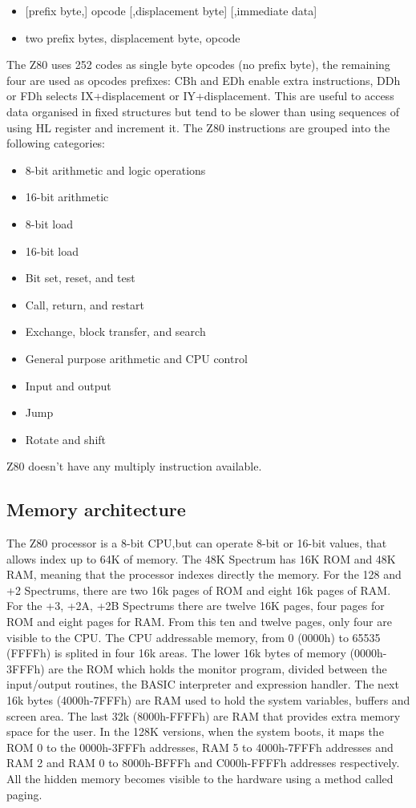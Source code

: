 \begin{itemize}
\item {[prefix byte,]  opcode  [,displacement byte]  [,immediate data]}
\item {two prefix bytes,  displacement byte,  opcode}
\end{itemize}
The Z80 uses 252 codes as single byte opcodes (no prefix byte), the remaining four are used as opcodes prefixes: CBh and EDh enable extra instructions, DDh or FDh selects IX+displacement or IY+displacement. This are useful to access data organised in fixed structures but tend to be slower than using sequences of using HL register and increment it.
The Z80 instructions are grouped into the following categories:
\begin{itemize}
\item {8-bit arithmetic and logic operations}
\item {16-bit arithmetic}
\item {8-bit load}
\item {16-bit load}
\item {Bit set, reset, and test}
\item {Call, return, and restart}
\item {Exchange, block transfer, and search}
\item {General purpose arithmetic and CPU control}
\item {Input and output}
\item {Jump}
\item {Rotate and shift}
\end{itemize}
Z80 doesn’t have any multiply instruction available.

\subsection{Memory architecture}
The Z80 processor is a 8-bit CPU,but can operate 8-bit or 16-bit values, that allows index up to 64K of memory. The 48K Spectrum has 16K ROM and 48K RAM, meaning that the processor indexes directly  the memory. For the 128 and +2 Spectrums, there are two 16k pages of ROM and eight 16k pages of RAM. For the +3, +2A, +2B Spectrums there are twelve 16K pages, four pages for ROM and eight pages for RAM. From this ten and twelve pages, only four are visible to the CPU.
The CPU addressable memory, from 0 (0000h) to 65535 (FFFFh) is splited in four 16k areas. The lower 16k bytes of memory (0000h-3FFFh) are the ROM which holds the monitor program, divided between the input/output routines, the BASIC interpreter and expression handler. The next 16k bytes (4000h-7FFFh) are RAM used to hold the system variables, buffers and screen area. The last 32k (8000h-FFFFh) are RAM that provides extra memory space for the user.
In the 128K versions, when the system boots, it maps the ROM 0 to the 0000h-3FFFh addresses, RAM 5 to 4000h-7FFFh addresses and RAM 2 and RAM 0 to 8000h-BFFFh and C000h-FFFFh addresses respectively. All the hidden memory becomes visible to the hardware using a method called paging.

